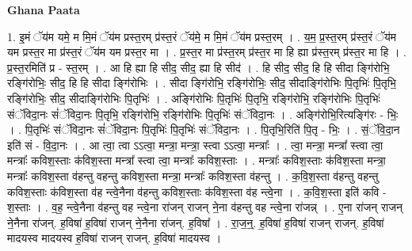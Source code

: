 \documentclass[17pt]{extarticle}
\begin{document}
\textbf{Ghana Paata } \newline

1. इ॒मं ॅय॑म यमे॒ म मि॒मं ॅय॑म प्रस्त॒रम् प्र॑स्त॒रं ॅय॑मे॒ म मि॒मं ॅय॑म प्रस्त॒रम् । . य॒म॒ प्र॒स्त॒रम् प्र॑स्त॒रं ॅय॑म यम प्रस्त॒र मा प्र॑स्त॒रं ॅय॑म यम प्रस्त॒र मा । . प्र॒स्त॒र मा प्र॑स्त॒रम् प्र॑स्त॒र मा हि ह्या प्र॑स्त॒रम् प्र॑स्त॒र मा हि । . प्र॒स्त॒रमिति॑ प्र - स्त॒रम् । . आ हि ह्या हि सीद॒ सीद॒ ह्या हि सीद॑ । . हि सीद॒ सीद॒ हि हि सीदा ङ्गि॑रोभि॒ रङ्गि॑रोभिः॒ सीद॒ हि हि सीदा ङ्गि॑रोभिः । . सीदा ङ्गि॑रोभि॒ रङ्गि॑रोभिः॒ सीद॒ सीदाङ्गि॑रोभिः पि॒तृभिः॑ पि॒तृभि॒ रङ्गि॑रोभिः॒ सीद॒ सीदाङ्गि॑रोभिः पि॒तृभिः॑ । . अङ्गि॑रोभिः पि॒तृभिः॑ पि॒तृभि॒ रङ्गि॑रोभि॒ रङ्गि॑रोभिः पि॒तृभिः॑ संॅविदा॒नः सं॑ॅविदा॒नः पि॒तृभि॒ रङ्गि॑रोभि॒ रङ्गि॑रोभिः पि॒तृभिः॑ संॅविदा॒नः । . अङ्गि॑रोभि॒रित्यङ्गि॑रः - भिः॒ । . पि॒तृभिः॑ संॅविदा॒नः सं॑ॅविदा॒नः पि॒तृभिः॑ पि॒तृभिः॑ संॅविदा॒नः । . पि॒तृभि॒रिति॑ पि॒तृ - भिः॒ । . सं॒ॅवि॒दा॒न इति॑ सं - वि॒दा॒नः । . आ त्वा॒ त्वा ऽऽत्वा॒ मन्त्रा॒ मन्त्रा॒ स्त्वा ऽऽत्वा॒ मन्त्राः᳚ । . त्वा॒ मन्त्रा॒ मन्त्रा᳚ स्त्वा त्वा॒ मन्त्राः᳚ कविश॒स्ताः क॑विश॒स्ता मन्त्रा᳚ स्त्वा त्वा॒ मन्त्राः᳚ कविश॒स्ताः । . मन्त्राः᳚ कविश॒स्ताः क॑विश॒स्ता मन्त्रा॒ मन्त्राः᳚ कविश॒स्ता व॑हन्तु वहन्तु कविश॒स्ता मन्त्रा॒ मन्त्राः᳚ कविश॒स्ता व॑हन्तु । . क॒वि॒श॒स्ता व॑हन्तु वहन्तु कविश॒स्ताः क॑विश॒स्ता व॑ह न्त्वे॒नैना व॑हन्तु कविश॒स्ताः क॑विश॒स्ता व॑ह न्त्वे॒ना । . क॒वि॒श॒स्ता इति॑ कवि - श॒स्ताः । . व॒ह॒ न्त्वे॒नैना व॑हन्तु वह न्त्वे॒ना रा॑जन् राजन् ने॒ना व॑हन्तु वह न्त्वे॒ना रा॑जन्न् । . ए॒ना रा॑जन् राजन् ने॒नैना रा॑जन्. ह॒विषा॑ ह॒विषा॑ राजन् ने॒नैना रा॑जन्. ह॒विषा᳚ । . रा॒ज॒न्॒. ह॒विषा॑ ह॒विषा॑ राजन् राजन्. ह॒विषा॑ मादयस्व मादयस्व ह॒विषा॑ राजन् राजन्. ह॒विषा॑ मादयस्व । \newline
\end{document}
